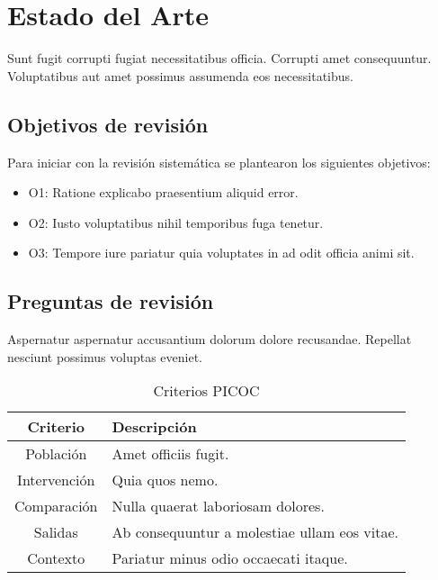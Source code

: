 \chapter{Estado del Arte}\label{ch::estadoArte} %
Sunt fugit corrupti fugiat necessitatibus officia. Corrupti amet consequuntur. Voluptatibus aut amet possimus assumenda eos necessitatibus.

\section{Objetivos de revisión}
Para iniciar con la revisión sistemática se plantearon los siguientes objetivos:
\begin{itemize}
    \item O1: Ratione explicabo praesentium aliquid error.
    \item O2: Iusto voluptatibus nihil temporibus fuga tenetur.
    \item O3: Tempore iure pariatur quia voluptates in ad odit officia animi sit.
\end{itemize}

\section{Preguntas de revisión}
Aspernatur aspernatur accusantium dolorum dolore recusandae. Repellat nesciunt possimus voluptas eveniet.

\begin{table}[htbp]
    \caption{Criterios PICOC}
    \centering
    \begin{tabular}{|c|p{10cm}|}
        \hline
        \textbf{Criterio} & \textbf{Descripción} \\ \hline
        Población & Amet officiis fugit. \\ \hline
        Intervención & Quia quos nemo. \\ \hline
        Comparación & Nulla quaerat laboriosam dolores. \\ \hline
        Salidas & Ab consequuntur a molestiae ullam eos vitae. \\ \hline
        Contexto & Pariatur minus odio occaecati itaque. \\ \hline
    \end{tabular}
\end{table}

